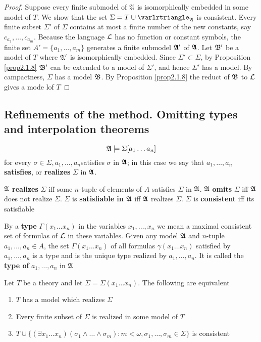 \documentclass[11pt]{article}
\begin{document}
\begin{proof}
Suppose every finite submodel of \(\mathfrak{A}\) is isomorphically embedded in some
model of \(T\). We show that the set \(\Sigma=T\cup\varlrtriangle_{\fA}\) is
consistent. Every finite subset \(\Sigma'\) of \(\Sigma\) contains at most a finite
number of the new constants, say \(c_{a_1},\dots,c_{a_m}\). Because the
language \(\mathcal{L}\) has no function or constant symbols, the finite set
\(A'=\{a_1,\dots,a_m\}\) generates a finite submodel \(\mathfrak{A}'\) of \(\mathfrak{A}\). Let
\(\mathfrak{B}'\) be a model of \(T\) where \(\mathfrak{A}'\) is isomorphically embedded. Since
\(\Sigma'\subset\Sigma\), by Proposition \ref{prop2.1.8} \(\mathfrak{B}'\) can be
extended to a model of \(\Sigma'\), and hence \(\Sigma'\) has a model. By
campactness, \(\Sigma\) has a model \(\mathfrak{B}\). By Proposition \ref{prop2.1.8} the reduct
of \(\mathfrak{B}\) to \(\mathcal{L}\) gives a mode lof \(T\)
\end{proof}

\subsection{Refinements of the method. Omitting types and interpolation theorems}
\label{sec:orgca79c4f}
\begin{equation*}
\mathfrak{A}\models\Sigma[a_1\dots a_n]
\end{equation*}
for every \(\sigma\in\Sigma,a_1,\dots,a_n\)satisfies \(\sigma\) in \(\mathfrak{A}\); in this
case we say that \(a_1,\dots,a_n\) \textbf{satisfies}, or \textbf{realizes} \(\Sigma\) in \(\mathfrak{A}\).

\(\mathfrak{A}\) \textbf{realizes} \(\Sigma\) iff some \(n\)-tuple of elements of \(A\) satisfies
\(\Sigma\) in \(\mathfrak{A}\). \(\mathfrak{A}\) \textbf{omits} \(\Sigma\) iff \(\mathfrak{A}\) does not realize \(\Sigma\).
\(\Sigma\) is \textbf{satisfiable in \(\mathfrak{A}\)} iff \(\mathfrak{A}\) realizes \(\Sigma\). \(\Sigma\) is \textbf{consistent} iff its satisfiable

By a \textbf{type} \(\Gamma(x_1\dots x_n)\) in the variables \(x_1,\dots,x_n\) we mean a
maximal consistent set of formulas of \(\mathcal{L}\) in these variables. Given any
model \(\mathfrak{A}\) and \(n\)-tuple \(a_1,\dots,a_n\in A\), the set \(\Gamma(x_1\dots
   x_n)\) of all formulas \(\gamma(x_1\dots x_n)\) satisfied by \(a_1,\dots,a_n\) is
a type and is the unique type realized by \(a_1,\dots,a_n\). It is called the
\textbf{type of} \(a_1,\dots,a_n\) in \(\mathfrak{A}\)

\begin{proposition}[]
Let \(T\) be a theory and let \(\Sigma=\Sigma(x_1\dots x_n)\). The following
are equivalent
\begin{enumerate}
\item \(T\) has a model which realizes \(\Sigma\)
\item Every finite subset of \(\Sigma\) is realized in some model of \(T\)
\item \(T\cup\{(\exists x_1\dots x_n)(\sigma_1\wedge\dots\wedge
      \sigma_m):m<\omega,\sigma_1,\dots,\sigma_m\in\Sigma\}\) is consistent
\end{enumerate}
\end{proposition}
\end{document}
